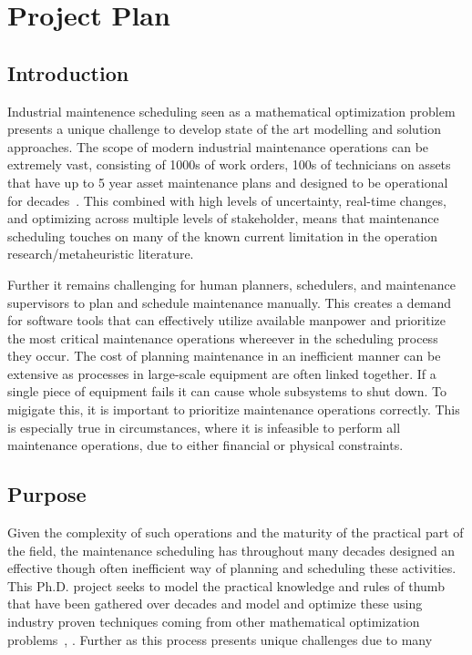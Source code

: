 \documentclass{article}
\begin{document}
\section{Project Plan}
\subsection{Introduction}
Industrial maintenence scheduling seen as a mathematical optimization problem presents a unique challenge to develop
state of the art modelling and solution approaches. The scope of modern industrial maintenance operations
can be extremely vast, consisting of 1000s of work orders,
100s of technicians on assets that have up to 5 year asset maintenance plans and designed to be operational
for decades~\cite{palmerMaintenancePlanningScheduling2019}. This combined with high levels of uncertainty,
real-time changes, and optimizing across multiple levels of stakeholder, means that maintenance scheduling
touches on many of the known current limitation in the operation research/metaheuristic literature.

Further it remains challenging for human planners, schedulers, and maintenance
supervisors to plan and schedule maintenance manually. This creates a demand for
software tools that can effectively utilize available manpower and prioritize
the most critical maintenance operations whereever in the scheduling process
they occur. The cost of planning maintenance in an inefficient manner can be
extensive as processes in large-scale equipment are often linked together. If a
single piece of equipment fails it can cause whole subsystems to shut down. To
migigate this, it is important to prioritize maintenance operations correctly.
This is especially true in circumstances, where it is infeasible to perform all
maintenance operations, due to either financial or physical constraints.

\subsection{Purpose}
Given the complexity of such operations and the maturity of the practical part of the field, the maintenance
scheduling has throughout many decades designed an effective though often inefficient way of planning and scheduling
these activities. This Ph.D. project seeks to model the practical knowledge and rules of thumb that have been gathered
over decades and model and optimize these using industry proven techniques coming from other mathematical optimization
problems~\cite{talbiMetaheuristicsDesignImplementation2009}, \cite{gendreauHandbookMetaheuristics2019}. Further as this
process presents unique challenges due to many
\end{document}
